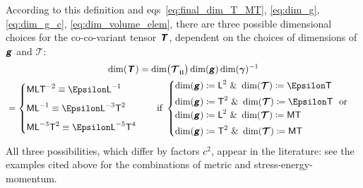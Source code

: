 \documentclass[\ifafour a4paper,12pt,\else a5paper,10pt,\fi%
onecolumn,oneside,article,%
british%
]{memoir}
\makeatletter
\theoremstyle{remark}
\theoremstyle{innote}
\newcommand*{\mathte}[1]{\textbf{\textit{\textsf{#1}}}}
\newcommand*{\amp}{\&}
\newcommand*{\defd}{\coloneqq}
\renewcommand*{\|}[1][]{\nonscript\,#1\vert\nonscript\;\mathopen{}}
\newcommand*{\sect}{\S}%
\newcommand*{\eqns}{eqs}%
\newcommand*{\q}{}%
\DeclareRobustCommand*{\q}{%
  \mathbin{\mathpalette\bigcdot@{}}%
}
\newcommand*{\bigcdot@scalefactor}{0.7}
\newcommand*{\bigcdot@widthfactor}{1.5}
\newcommand*{\bigcdot@}[2]{%
  \sbox0{$#1\vcenter{}$}%
  \sbox2{$#1\cdot\m@th$}%
  \hbox to \bigcdot@widthfactor\wd2{%
    \hfil
    \raise\ht0\hbox{%
      \scalebox{\bigcdot@scalefactor}{%
        \lower\ht0\hbox{$#1\bullet\m@th$}%
      }%
    }%
    \hfil
  }%
}
\newcommand*{\Le}{\textsf{L}}
\newcommand*{\Ti}{\textsf{T}}
\newcommand*{\Ma}{\textsf{M}}
\newcommand*{\En}{\Epsilon}%
\newcommand*{\yg}{\mathte{g}}
\newcommand*{\yT}{\bm{\mathcal{T}}}
\newcommand*{\yTe}{\mathte{T}}
\renewcommand*{\i}{\indices}
\newcommand*{\ygv}{\bm{\gamma}}
\newcommand*{\rul}{{\mkern2mu\rule[-0.1ex]{0.75pt}{1.1ex}\mkern2mu}}
\DeclarePairedDelimiter\mul{\rul}{\rul}%
\makeatother
\begin{document}
According to this definition and \eqns~\eqref{eq:final_dim_T_MT},
\eqref{eq:dim_g}, \eqref{eq:dim_g_c}, \eqref{eq:dim_volume_elem}, there are
three possible dimensional choices for the co-co-variant tensor $\yTe$,
dependent on the choices of dimensions of $\yg$ and $\yT$:
\begin{multline}
\label{eq:dim_co_co_T}
\dim(\yTe\i{_{\q\q}}) =
\dim\bigl(\yT\i{_{\q \mul{\q\q\q}}}\bigr) \dim(\yg) \dim(\ygv)^{-1}
  \\{}=
  \begin{cases}
\Ma\Le\Ti^{-2} \equiv \En\Le^{-1} \\[2\jot]
\Ma\Le^{-1} \equiv \En\Le^{-3}\Ti^{2} \\[2\jot]
\Ma\Le^{-3}\Ti^{2} \equiv \En\Le^{-5}\Ti^{4}
  \end{cases}
  \quad\text{if }
  \begin{cases}
\dim(\yg)\defd \Le^2 \text{ \amp\ }\dim(\yT)\defd \En\Ti \\[\jot]
    \dim(\yg)\defd \Ti^2 \text{ \amp\ }\dim(\yT)\defd \En\Ti 
    \ \text{ or }\\
\dim(\yg)\defd \Le^2 \text{ \amp\ }\dim(\yT)\defd \Ma\Ti \\[\jot]
\dim(\yg)\defd \Ti^2 \text{ \amp\ }\dim(\yT)\defd \Ma\Ti
  \end{cases}
\end{multline}
All three possibilities, which differ by factors $c^{2}$, appear in the
literature: see the examples cited above for the combinations of metric and
stress-energy-momentum.

 


\end{document}
